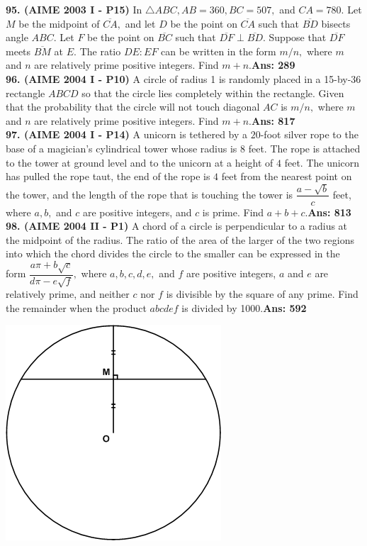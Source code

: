 \documentclass[letterpaper,10pt,addpoints]{exam}
\begin{document}
\textbf{95. (AIME 2003 I - P15) }In $\triangle ABC, AB = 360, BC = 507,$ and $CA = 780.$ Let $M$ be the midpoint of $\overline{CA},$ and let $D$ be the point on $\overline{CA}$ such that $\overline{BD}$ bisects angle $ABC.$ Let $F$ be the point on $\overline{BC}$ such that $\overline{DF} \perp \overline{BD}.$ Suppose that $\overline{DF}$ meets $\overline{BM}$ at $E.$ The ratio $DE: EF$ can be written in the form $m/n,$ where $m$ and $n$ are relatively prime positive integers. Find $m + n.$\quad\textbf{Ans: 289}\\

\textbf{96. (AIME 2004 I - P10) }A circle of radius 1 is randomly placed in a 15-by-36 rectangle $ABCD$ so that the circle lies completely within the rectangle. Given that the probability that the circle will not touch diagonal $AC$ is $m/n,$ where $m$ and $n$ are relatively prime positive integers. Find $m + n.$\quad\textbf{Ans: 817}\\

\textbf{97. (AIME 2004 I - P14) }A unicorn is tethered by a $20$-foot silver rope to the base of a magician's cylindrical tower whose radius is $8$ feet. The rope is attached to the tower at ground level and to the unicorn at a height of $4$ feet. The unicorn has pulled the rope taut, the end of the rope is $4$ feet from the nearest point on the tower, and the length of the rope that is touching the tower is $\dfrac{a-\sqrt{b}}c$ feet, where $a, b,$ and $c$ are positive integers, and $c$ is prime. Find $a+b+c.$\quad\textbf{Ans: 813}\\

\textbf{98. (AIME 2004 II - P1) }A chord of a circle is perpendicular to a radius at the midpoint of the radius. The ratio of the area of the larger of the two regions into which the chord divides the circle to the smaller can be expressed in the form $\dfrac{a\pi+b\sqrt{c}}{d\pi-e\sqrt{f}},$ where $a, b, c, d, e,$ and $f$ are positive integers, $a$ and $e$ are relatively prime, and neither $c$ nor $f$ is divisible by the square of any prime. Find the remainder when the product $abcdef$ is divided by 1000.\quad\textbf{Ans: 592}

\begin{center}
\includegraphics[scale=0.4]{2004_AIME_II_Problem_1.png}
\end{center}
\end{document}
